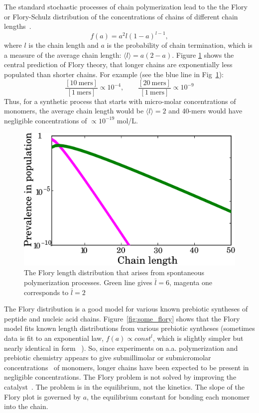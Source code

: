 \documentclass[journal=jacsat,manuscript=article,layout=twocolumn]{achemso}
\newcommand*{\pq}[1]{\left[ #1 \right]}
\begin{document}
The standard stochastic processes of chain polymerization lead to the the Flory or 
Flory-Schulz distribution of the concentrations of chains of different chain 
lengths~\cite{Flory1953}. 
\begin{equation}
 f(a)=a^2l(1-a)^{l-1},
\end{equation} 
where $l$ is the chain length and $a$ is the probability of chain termination, 
which is a measure of the average chain length: $\langle l \rangle = a(2- a)$.
Figure \ref{fig:flory} shows the central prediction of Flory theory, that 
longer chains are exponentially less populated than shorter chains.  For example (see the blue line 
in Fig~\ref{fig:flory}):
\begin{equation}  
\frac{\pq{10~\mathrm{mers}}}{\pq{1~\mathrm{mers}}}\propto10^{-4},\qquad\frac{\pq{20~\mathrm{mers}}}{
\pq{1~\mathrm{mers}}}\propto10^{-9}
\end{equation} 
Thus, for a synthetic process that starts with micro-molar concentrations of monomers, the 
average chain length would be $\langle l \rangle = 2$ and 40-mers would have 
negligible concentrations of $\propto 10^{-19} $ mol/L. 
\begin{figure}[h!]
  \centering
  \includegraphics[width=\columnwidth]{pictures/flory2.pdf} 
  \caption{The Flory length distribution that arises from spontaneous polymerization processes. 
Green line gives $\bar l = 6$, magenta one corresponds to $\bar l =2$}
  \label{fig:flory}
\end{figure}

The Flory distribution is a good model for various known prebiotic syntheses of peptide and nucleic 
acid chains.  Figure~\ref{fig:some_flory} shows that the Flory model fits known length 
distributions 
from various prebiotic syntheses (sometimes data is fit to an exponential law, $f(a)\propto 
const^l$, which is slightly simpler but nearly identical in form 
~\cite{nowak2008prevolutionary,Derr2012}).  So, since experiments on a.a. polymerization and 
prebiotic chemistry appears to give submillimolar or submicromolar 
concentrations~\cite{Stribling1987,Huber1998,Aubrey2009,Kanavarioti2001,Lazcano1996} of monomers, 
longer chains have been expected to be present in negligible concentrations.  The Flory problem is 
not solved by improving the catalyst~\cite{Derr2012}. The problem is in the equilibrium, not the 
kinetics.  The slope of the Flory plot is governed by $a$, the equilibrium constant for bonding 
each 
monomer into the chain.
\end{document}
